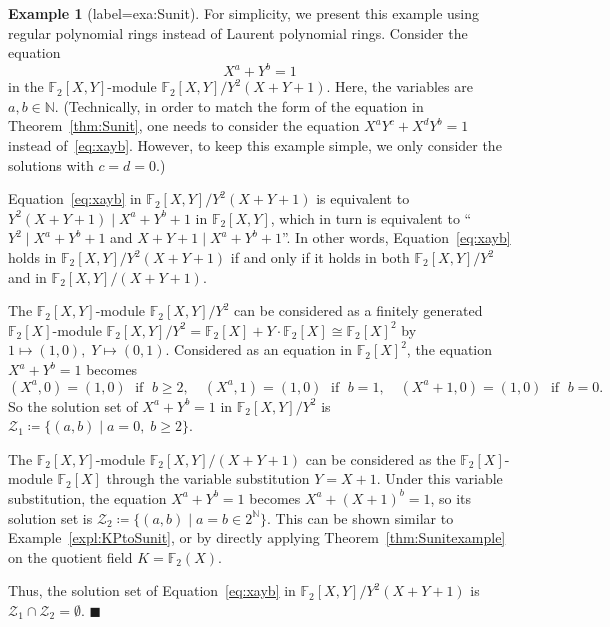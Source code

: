 \documentclass[a4paper,UKenglish,cleveref, autoref, thm-restate]{lipics-v2021}
\newcommand{\N}{\mathbb{N}}
\newcommand{\F}{\mathbb{F}}
\newcommand{\mZ}{\mathcal{Z}}
\theoremstyle{definition}
\theoremstyle{definition}
\newtheorem{exmpl}[thrm]{Example}
\theoremstyle{definition}
\begin{document}
\begin{exmpl}[label=exa:Sunit]\label{expl:decomp}
    For simplicity, we present this example using regular polynomial rings instead of Laurent polynomial rings. Consider the equation
    \begin{equation}\label{eq:xayb}
        X^{a} + Y^{b} = 1
    \end{equation}
    in the $\F_2[X, Y]$-module $\F_2[X, Y]/Y^2(X+Y+1)$. Here, the variables are $a, b \in \N$.
    (Technically, in order to match the form of the equation in Theorem~\ref{thm:Sunit}, one needs to consider the equation $X^{a} Y^c + X^d Y^{b} = 1$ instead of~\eqref{eq:xayb}. However, to keep this example simple, we only consider the solutions with $c = d = 0$.)

    Equation~\eqref{eq:xayb} in $\F_2[X, Y]/Y^2(X+Y+1)$ is equivalent to $Y^2(X+Y+1) \mid X^{a} + Y^{b} + 1$ in $\F_2[X, Y]$, which in turn is equivalent to ``$Y^2 \mid X^{a} + Y^{b} + 1$ and $X+Y+1 \mid X^{a} + Y^{b} + 1$''.
    In other words, Equation~\eqref{eq:xayb} holds in $\F_2[X, Y]/Y^2(X+Y+1)$ if and only if it holds in both $\F_2[X, Y]/Y^2$ and in $\F_2[X, Y]/(X + Y + 1)$.

	The $\F_2[X, Y]$-module $\F_2[X, Y]/Y^2$ can be considered as a finitely generated $\F_2[X]$-module $\F_2[X, Y]/Y^2 = \F_2[X] + Y \cdot \F_2[X] \cong \F_2[X]^2$ by $1 \mapsto (1, 0), \; Y \mapsto (0, 1)$.
    Considered as an equation in $\F_2[X]^2$, the equation $X^{a} + Y^{b} = 1$ becomes 
\[
(X^a, 0) = (1, 0) \; \text{ if } \; b \geq 2, \quad
(X^a, 1) = (1, 0) \; \text{ if } \; b = 1, \quad
(X^a + 1, 0) = (1, 0) \; \text{ if } \; b = 0.
\]
	So the solution set of $X^{a} + Y^{b} = 1$ in $\F_2[X, Y]/Y^2$ is $\mZ_1 \coloneqq \{(a, b) \mid a = 0, \; b \geq 2\}$.
	
	The $\F_2[X, Y]$-module $\F_2[X, Y]/(X + Y + 1)$ can be considered as the $\F_2[X]$-module $\F_2[X]$ through the variable substitution $Y = X + 1$.
	Under this variable substitution, the equation $X^{a} + Y^{b} = 1$ becomes $X^{a} + (X+1)^b = 1$, so its solution set is $\mZ_2 \coloneqq \{(a, b) \mid a = b \in 2^{\N}\}$. This can be shown similar to Example~\ref{expl:KPtoSunit}, or by directly applying Theorem~\ref{thm:Sunitexample} on the quotient field $K = \F_2(X)$.
	
    Thus, the solution set of Equation~\eqref{eq:xayb} in $\F_2[X, Y]/Y^2(X+Y+1)$ is $\mZ_1 \cap \mZ_2 = \emptyset$.
    \hfill $\blacksquare$
\end{exmpl}
\end{document}
